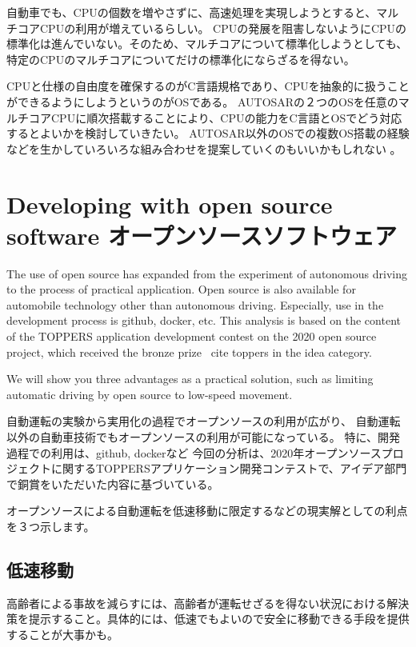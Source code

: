 \documentclass[twocolumn]{article} %
\begin{document}
自動車でも、CPUの個数を増やさずに、高速処理を実現しようとすると、マルチコアCPUの利用が増えているらしい。
CPUの発展を阻害しないようにCPUの標準化は進んでいない。そのため、マルチコアについて標準化しようとしても、特定のCPUのマルチコアについてだけの標準化にならざるを得ない。

CPUと仕様の自由度を確保するのがC言語規格であり、CPUを抽象的に扱うことができるようにしようというのがOSである。
AUTOSARの２つのOSを任意のマルチコアCPUに順次搭載することにより、CPUの能力をC言語とOSでどう対応するとよいかを検討していきたい\cite{multicore}。
AUTOSAR以外のOSでの複数OS搭載の経験などを生かしていろいろな組み合わせを提案していくのもいいかもしれない\cite{multicore2019} 。

\section{Developing with open source software オープンソースソフトウェア}
The use of open source has expanded from the experiment of autonomous driving to the process of practical application.
Open source is also available for automobile technology other than autonomous driving.
Especially, use in the development process is github, docker, etc.
This analysis is based on the content of the TOPPERS application development contest on the 2020 open source project, which received the bronze prize \ cite {toppers} in the idea category.

We will show you three advantages as a practical solution, such as limiting automatic driving by open source to low-speed movement.

自動運転の実験から実用化の過程でオープンソースの利用が広がり、
自動運転以外の自動車技術でもオープンソースの利用が可能になっている。
特に、開発過程での利用は、github, dockerなど
今回の分析は、2020年オープンソースプロジェクトに関するTOPPERSアプリケーション開発コンテストで、アイデア部門で銅賞\cite{toppers}をいただいた内容に基づいている。

オープンソースによる自動運転を低速移動に限定するなどの現実解としての利点を３つ示します。


\subsection{低速移動}

高齢者による事故を減らすには、高齢者が運転せざるを得ない状況における解決策を提示すること。具体的には、低速でもよいので安全に移動できる手段を提供することが大事かも。
\cite{yamaha1}
\cite{yamaha2}
\cite{yamaha3}
\cite{yamaha4}
\cite{yamaha5}
\cite{yamaha6}
\end{document}
